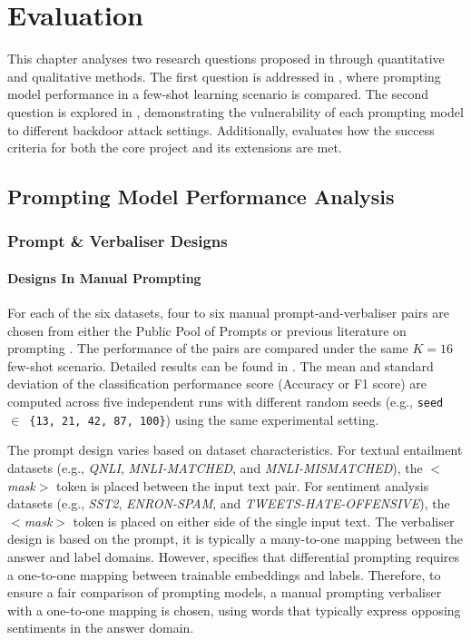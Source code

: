 \chapter{Evaluation} 
\label{sec:evaluation}
This chapter analyses two research questions proposed in  through quantitative and qualitative methods. The first question is addressed in , where prompting model performance in a few-shot learning scenario is compared. The second question is explored in , demonstrating the vulnerability of each prompting model to different backdoor attack settings. Additionally,  evaluates how the success criteria for both the core project and its extensions are met.

\section{Prompting Model Performance Analysis} \label{sec:eval-prompt}
\subsection{Prompt \& Verbaliser Designs}
\subsubsection{Designs In Manual Prompting} \label{sec:eval-manul-prompt}
For each of the six datasets, four to six manual prompt-and-verbaliser pairs are chosen from either the Public Pool of Prompts \cite{Bach22OPP} or previous literature on prompting \cite{Gao20PM, Lei22}. The performance of the pairs are compared under the same $K = 16$ few-shot scenario. Detailed results can be found in . The mean and standard deviation of the classification performance score (Accuracy or F1 score) are computed across five independent runs with different random seeds (e.g., \texttt{seed $\in$ \{13, 21, 42, 87, 100\}}) using the same experimental setting. 


The prompt design varies based on dataset characteristics. For textual entailment datasets (e.g., \textit{QNLI}, \textit{MNLI-MATCHED}, and \textit{MNLI-MISMATCHED}), the $<$\textit{mask}$>$ token is placed between the input text pair. For sentiment analysis datasets (e.g., \textit{SST2}, \textit{ENRON-SPAM}, and \textit{TWEETS-HATE-OFFENSIVE}), the $<$\textit{mask}$>$ token is placed on either side of the single input text. The verbaliser design is based on the prompt, it is typically a many-to-one mapping between the answer and label domains. However,  specifies that differential prompting requires a one-to-one mapping between trainable embeddings and labels. Therefore, to ensure a fair comparison of prompting models, a manual prompting verbaliser with a one-to-one mapping is chosen, using words that typically express opposing sentiments in the answer domain.

